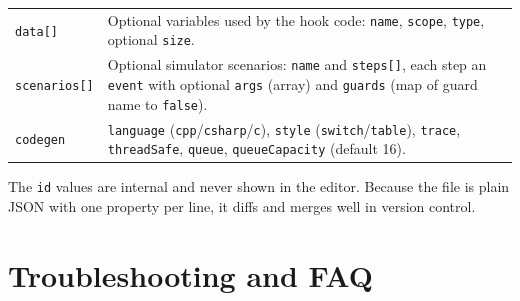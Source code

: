 \documentclass[11pt,a4paper,openany]{report}
\newcommand{\code}[1]{\texttt{#1}}
\begin{document}
\begin{longtable}{@{}p{3.8cm}p{10.6cm}@{}}
\code{data[]}                & Optional variables used by the hook code: \code{name}, \code{scope}, \code{type}, optional \code{size}. \\
\code{scenarios[]}           & Optional simulator scenarios: \code{name} and \code{steps[]}, each step an \code{event} with optional \code{args} (array) and \code{guards} (map of guard name to \code{false}). \\
\code{codegen}               & \code{language} (\code{cpp}/\code{csharp}/\code{c}), \code{style} (\code{switch}/\code{table}), \code{trace}, \code{threadSafe}, \code{queue}, \code{queueCapacity} (default 16). \\
\bottomrule
\end{longtable}



The \code{id} values are internal and never shown in the editor. Because the file is plain JSON with
one property per line, it diffs and merges well in version control.

\chapter{Troubleshooting and FAQ}
\end{document}
